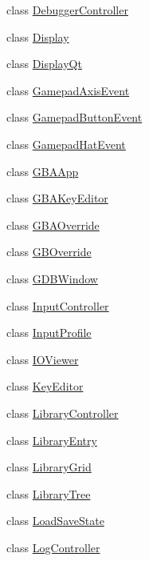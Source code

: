 \begin{DoxyCompactItemize}
\item 
class \mbox{\hyperlink{class_q_g_b_a_1_1_debugger_controller}{Debugger\+Controller}}
\item 
class \mbox{\hyperlink{class_q_g_b_a_1_1_display}{Display}}
\item 
class \mbox{\hyperlink{class_q_g_b_a_1_1_display_qt}{Display\+Qt}}
\item 
class \mbox{\hyperlink{class_q_g_b_a_1_1_gamepad_axis_event}{Gamepad\+Axis\+Event}}
\item 
class \mbox{\hyperlink{class_q_g_b_a_1_1_gamepad_button_event}{Gamepad\+Button\+Event}}
\item 
class \mbox{\hyperlink{class_q_g_b_a_1_1_gamepad_hat_event}{Gamepad\+Hat\+Event}}
\item 
class \mbox{\hyperlink{class_q_g_b_a_1_1_g_b_a_app}{G\+B\+A\+App}}
\item 
class \mbox{\hyperlink{class_q_g_b_a_1_1_g_b_a_key_editor}{G\+B\+A\+Key\+Editor}}
\item 
class \mbox{\hyperlink{class_q_g_b_a_1_1_g_b_a_override}{G\+B\+A\+Override}}
\item 
class \mbox{\hyperlink{class_q_g_b_a_1_1_g_b_override}{G\+B\+Override}}
\item 
class \mbox{\hyperlink{class_q_g_b_a_1_1_g_d_b_window}{G\+D\+B\+Window}}
\item 
class \mbox{\hyperlink{class_q_g_b_a_1_1_input_controller}{Input\+Controller}}
\item 
class \mbox{\hyperlink{class_q_g_b_a_1_1_input_profile}{Input\+Profile}}
\item 
class \mbox{\hyperlink{class_q_g_b_a_1_1_i_o_viewer}{I\+O\+Viewer}}
\item 
class \mbox{\hyperlink{class_q_g_b_a_1_1_key_editor}{Key\+Editor}}
\item 
class \mbox{\hyperlink{class_q_g_b_a_1_1_library_controller}{Library\+Controller}}
\item 
class \mbox{\hyperlink{class_q_g_b_a_1_1_library_entry}{Library\+Entry}}
\item 
class \mbox{\hyperlink{class_q_g_b_a_1_1_library_grid}{Library\+Grid}}
\item 
class \mbox{\hyperlink{class_q_g_b_a_1_1_library_tree}{Library\+Tree}}
\item 
class \mbox{\hyperlink{class_q_g_b_a_1_1_load_save_state}{Load\+Save\+State}}
\item 
class \mbox{\hyperlink{class_q_g_b_a_1_1_log_controller}{Log\+Controller}}
\item 

\end{DoxyCompactItemize}
